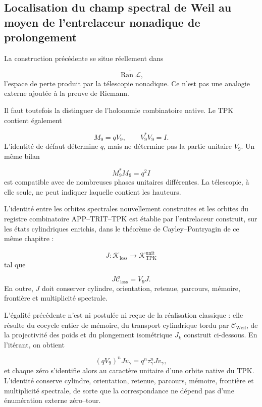 \subsection{Localisation du champ spectral de Weil au moyen de l'entrelaceur nonadique de prolongement}
La construction précédente se situe réellement dans\par
\[
\overline{\operatorname{Ran}\mathscr L},
\]
l'espace de perte produit par la télescopie nonadique. Ce n'est pas une analogie externe ajoutée à la preuve de Riemann.\par
Il faut toutefois la distinguer de l'holonomie combinatoire native. Le TPK contient également\par
\[
M_9=qV_9,
\qquad
V_9^*V_9=I.
\]
L'identité de défaut détermine \(q\), mais ne détermine pas la partie unitaire \(V_9\). Un même bilan\par
\[
M_9^*M_9=q^2I
\]
est compatible avec de nombreuses phases unitaires différentes. La télescopie, à elle seule, ne peut indiquer laquelle contient les hauteurs.\par
L'identité entre les orbites spectrales nouvellement construites et les orbites du registre combinatoire APP–TRIT–TPK est établie par l'entrelaceur construit, sur les états cylindriques enrichis, dans le théorème de Cayley--Pontryagin de ce même chapitre :\par
\[
J:
\mathcal K_{\mathrm{loss}}
\longrightarrow
\mathcal K_{\mathrm{TPK}}^{\mathrm{unit}}
\]
tal que\par
\[
\boxed{
J\mathcal C_{\mathrm{loss}}
=
V_9J.
}
\]
En outre, \(J\) doit conserver cylindre, orientation, retenue, parcours, mémoire, frontière et multiplicité spectrale.\par
L'égalité précédente n'est ni postulée ni reçue de la réalisation classique : elle résulte du cocycle entier de mémoire, du transport cylindrique tordu par \(\mathcal C_{\mathrm{Weil}}\), de la projectivité des poids et du plongement isométrique \(J_k\) construit ci-dessous. En l'itérant, on obtient\par
\[
(qV_9)^nJv_\gamma
=
q^n\tau_\gamma^nJv_\gamma,
\]
et chaque zéro s'identifie alors au caractère unitaire d'une orbite native du TPK. L'identité conserve cylindre, orientation, retenue, parcours, mémoire, frontière et multiplicité spectrale, de sorte que la correspondance ne dépend pas d'une énumération externe zéro--tour.\par
{}

